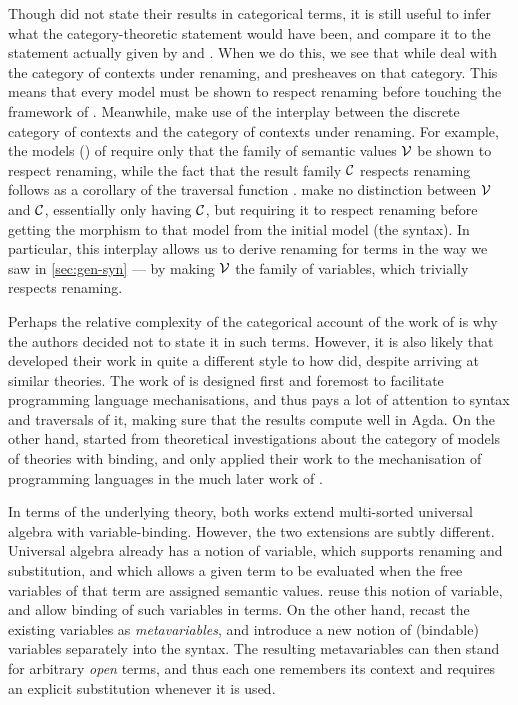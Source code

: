 Though \citet{AACMM21} did not state their results in categorical terms, it is
still useful to infer what the category-theoretic statement would have been, and
compare it to the statement actually given by \citet{FPT99} and \citet{FS22}.
When we do this, we see that while \citeauthor{FPT99} deal with the category of
contexts under renaming, and presheaves on that category.
This means that every model must be shown to respect renaming before touching
the framework of \citeauthor{FS22}.
Meanwhile, \citeauthor{AACMM21} make use of the interplay between the discrete
category of contexts and the category of contexts under renaming.
For example, the models () of \citet{AACMM21} require only
that the family of semantic values $\mathcal V$ be shown to respect renaming, while the
fact that the result family $\mathcal C$ respects renaming follows as a corollary of the
traversal function .
 make no distinction between $\mathcal V$ and $\mathcal C$, essentially only
having $\mathcal C$, but requiring it to respect renaming before getting the morphism
to that model from the initial model (the syntax).
In particular, this interplay allows us to derive renaming for terms in the way
we saw in \cref{sec:gen-syn} --- by making $\mathcal V$ the family of variables, which
trivially respects renaming.

Perhaps the relative complexity of the categorical account of the work of
\citet{AACMM21} is why the authors decided not to state it in such terms.
However, it is also likely that \citeauthor{AACMM21} developed their work in
quite a different style to how \citeauthor{FPT99} did, despite arriving at
similar theories.
The work of \citet{AACMM21} is designed first and foremost to facilitate
programming language mechanisations, and thus pays a lot of attention to syntax
and traversals of it, making sure that the results compute well in Agda.
On the other hand, \citeauthor{FPT99} started from theoretical investigations
about the category of models of theories with binding, and only applied their
work to the mechanisation of programming languages in the much later work of
\citet{FS22}.

In terms of the underlying theory, both works extend multi-sorted universal
algebra%
with variable-binding.
However, the two extensions are subtly different.
Universal algebra already has a notion of variable, which supports renaming and
substitution, and which allows a given term to be evaluated when the free
variables of that term are assigned semantic values.
\citeauthor{AACMM21} reuse this notion of variable, and allow binding of such
variables in terms.
On the other hand, \citeauthor{FS22} recast the existing variables as
\emph{metavariables}, and introduce a new notion of (bindable) variables
separately into the syntax.
The resulting metavariables can then stand for arbitrary \emph{open} terms, and
thus each one remembers its context and requires an explicit substitution
whenever it is used.


